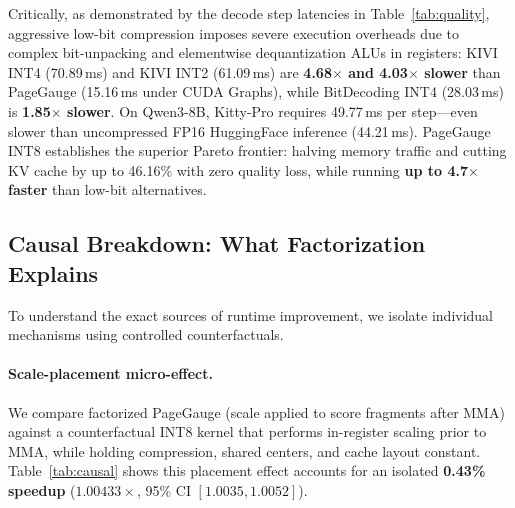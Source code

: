 \documentclass{article}
\begin{document}
Critically, as demonstrated by the decode step latencies in Table~\ref{tab:quality}, aggressive low-bit compression imposes severe execution overheads due to complex bit-unpacking and elementwise dequantization ALUs in registers: KIVI INT4 (70.89\,ms) and KIVI INT2 (61.09\,ms) are \textbf{4.68$\times$ and 4.03$\times$ slower} than PageGauge (15.16\,ms under CUDA Graphs), while BitDecoding INT4 (28.03\,ms) is \textbf{1.85$\times$ slower}. On Qwen3-8B, Kitty-Pro requires 49.77\,ms per step—even slower than uncompressed FP16 HuggingFace inference (44.21\,ms). PageGauge INT8 establishes the superior Pareto frontier: halving memory traffic and cutting KV cache by up to 46.16\% with zero quality loss, while running \textbf{up to 4.7$\times$ faster} than low-bit alternatives.

\subsection{Causal Breakdown: What Factorization Explains}
To understand the exact sources of runtime improvement, we isolate individual mechanisms using controlled counterfactuals.

\begin{table}[t]
\caption{Matched full-decoder scale-placement control. Compares register-scale control (scaling before MMA) vs.\ factorized execution (scaling after MMA) under identical INT8 cache layout and shared centers.}
\label{tab:causal}
\centering\small
{}
\end{table}

\paragraph{Scale-placement micro-effect.}
We compare factorized PageGauge (scale applied to score fragments after MMA) against a counterfactual INT8 kernel that performs in-register scaling prior to MMA, while holding compression, shared centers, and cache layout constant. Table~\ref{tab:causal} shows this placement effect accounts for an isolated \textbf{0.43\% speedup} ($1.00433\times$, 95\% CI $[1.0035, 1.0052]$).
\end{document}
